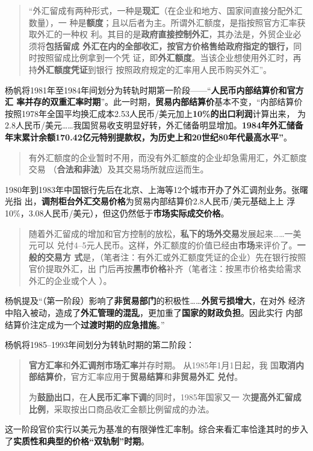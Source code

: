 \begin{quotation}
  “外汇留成有两种形式，一种是\textbf{现汇}（在企业和地方、国家间直接分配外汇数量），一
  种是\textbf{额度}；且以后者为主。所谓外汇额度，是指按照官方汇率获取外汇的一种权
  利。其目的是\textbf{政府直接控制外汇}，其办法是，外贸企业必须将\textbf{包括留成
    外汇在内的全部收汇，按官方价格售给政府指定的银行，}同时按照留成比例拿到一个凭
  证，即\textbf{外汇额度}。当该企业想使用外汇时，再持\textbf{外汇额度凭证}到银行
  按照政府规定的汇率用人民币购买外汇”。
\end{quotation}


杨帆将1981年至1984年间划分为转轨时期第一阶段——“\textbf{人民币内部结算价和官方汇
  率并存的双重汇率时期}”。此一时期，\textbf{贸易内部结算价}基本不变，“内部结算价
按照1978年全国平均换汇成本2.53人民币/美元加上\textbf{10\%的出口利润}计算出来，
为2.8人民币/美元……我国贸易收支明显好转，外汇储备明显增加。\textbf{1984年外汇储备
  年末累计余额170.42亿元特别提款权，为历史上和20世纪80年代最高水平”}。

\begin{quotation}
  有外汇额度的企业暂时不用，而没有外汇额度的企业却急需用汇，外汇额度交易
  （\textbf{合法和非法}）及其交易场所就应运而生。
\end{quotation}

1980年到1983年中国银行先后在北京、上海等12个城市开办了外汇调剂业务。张曙光指
出，\textbf{调剂柜台外汇交易价格}为贸易内部结算价2.8人民币/美元基础上上
浮10\%，3.08人民币/美元），但这仍然低于\textbf{市场实际成交价格}。

\begin{quotation}
  随着外汇留成的增加和官方控制的放松，\textbf{私下的场外交易}发展起来……一美元可以
  兑付4--5元人民币。这样，外汇额度的价值已经由\textbf{市场}来评价了。\textbf{一般的交易方
    式}是，（笔者注：有外汇或外汇额度凭证的企业）先在银行按照官价提取外汇，出
  门后再按\textbf{黑市价格}补齐（笔者注：按黑市价格卖给需求外汇的企业或个人
  ）。
\end{quotation}

杨帆提及“（第一阶段）影响了\textbf{非贸易部门}的积极性……\textbf{外贸亏损增大}，在对外
经济中陷入被动，造成了\textbf{外汇管理的混乱}，更加重了\textbf{国家的财政负担}。因此实行
内部结算价注定成为一个\textbf{过渡时期的应急措施}。”

杨帆将1985--1993年间划分为转轨时期的第二阶段：
\begin{quotation}
  \textbf{官方汇率}和\textbf{外汇调剂市场汇率}并存时期。 从1985年1月1日起，我
  国\textbf{取消内部结算价}，官方汇率应用于\textbf{贸易结算}和\textbf{非贸易外汇
    兑付}。

  为\textbf{鼓励出口}，在\textbf{人民币汇率下调}的同时，1985年国家又一
  次\textbf{提高外汇留成比例}，采取按出口商品收汇金额比例留成的办法。
\end{quotation}
这一阶段官价实行以美元为基准的有限弹性汇率制。综合来看汇率恰逢其时的步入
了\textbf{实质性和典型的价格“双轨制”时期}。

